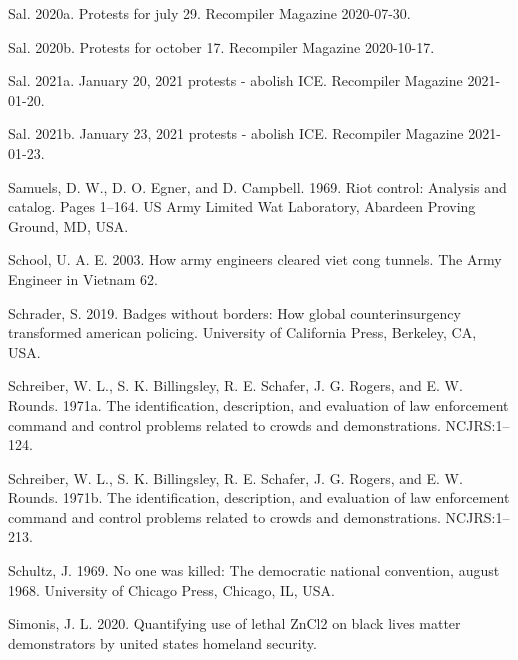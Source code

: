 \documentclass[
  11pt,
]{krantz}
\newlength{\cslhangindent}
\newlength{\cslentryspacingunit} %
\newenvironment{CSLReferences}[2] %
 {%
  \setlength{\parindent}{0pt}
  \ifodd #1
  \let\oldpar\par
  \def\par{\hangindent=\cslhangindent\oldpar}
  \fi
  \setlength{\parskip}{#2\cslentryspacingunit}
 }%
 {}
\begin{document}
\begin{CSLReferences}{1}{0}
\leavevmode{}%
Sal. 2020a. Protests for july 29. Recompiler Magazine 2020-07-30.

\leavevmode{}%
Sal. 2020b. Protests for october 17. Recompiler Magazine 2020-10-17.

\leavevmode{}%
Sal. 2021a. January 20, 2021 protests - abolish ICE. Recompiler Magazine 2021-01-20.

\leavevmode{}%
Sal. 2021b. January 23, 2021 protests - abolish ICE. Recompiler Magazine 2021-01-23.

\leavevmode{}%
Samuels, D. W., D. O. Egner, and D. Campbell. 1969. Riot control: Analysis and catalog. Pages 1--164. US Army Limited Wat Laboratory, Abardeen Proving Ground, MD, USA.

\leavevmode{}%
School, U. A. E. 2003. How army engineers cleared viet cong tunnels. The Army Engineer in Vietnam 62.

\leavevmode{}%
Schrader, S. 2019. Badges without borders: How global counterinsurgency transformed american policing. University of California Press, Berkeley, CA, USA.

\leavevmode{}%
Schreiber, W. L., S. K. Billingsley, R. E. Schafer, J. G. Rogers, and E. W. Rounds. 1971a. The identification, description, and evaluation of law enforcement command and control problems related to crowds and demonstrations. NCJRS:1--124.

\leavevmode{}%
Schreiber, W. L., S. K. Billingsley, R. E. Schafer, J. G. Rogers, and E. W. Rounds. 1971b. The identification, description, and evaluation of law enforcement command and control problems related to crowds and demonstrations. NCJRS:1--213.

\leavevmode{}%
Schultz, J. 1969. No one was killed: The democratic national convention, august 1968. University of Chicago Press, Chicago, IL, USA.

\leavevmode{}%
Simonis, J. L. 2020. Quantifying use of lethal ZnCl2 on black lives matter demonstrators by united states homeland security.


\end{CSLReferences}
\end{document}
